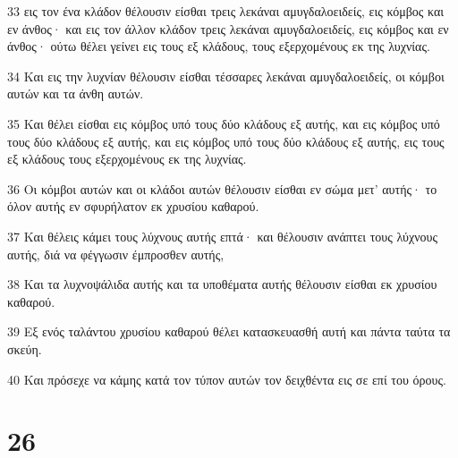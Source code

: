\par 33 εις τον ένα κλάδον θέλουσιν είσθαι τρεις λεκάναι αμυγδαλοειδείς, εις κόμβος και εν άνθος· και εις τον άλλον κλάδον τρεις λεκάναι αμυγδαλοειδείς, εις κόμβος και εν άνθος· ούτω θέλει γείνει εις τους εξ κλάδους, τους εξερχομένους εκ της λυχνίας.
\par 34 Και εις την λυχνίαν θέλουσιν είσθαι τέσσαρες λεκάναι αμυγδαλοειδείς, οι κόμβοι αυτών και τα άνθη αυτών.
\par 35 Και θέλει είσθαι εις κόμβος υπό τους δύο κλάδους εξ αυτής, και εις κόμβος υπό τους δύο κλάδους εξ αυτής, και εις κόμβος υπό τους δύο κλάδους εξ αυτής, εις τους εξ κλάδους τους εξερχομένους εκ της λυχνίας.
\par 36 Οι κόμβοι αυτών και οι κλάδοι αυτών θέλουσιν είσθαι εν σώμα μετ' αυτής· το όλον αυτής εν σφυρήλατον εκ χρυσίου καθαρού.
\par 37 Και θέλεις κάμει τους λύχνους αυτής επτά· και θέλουσιν ανάπτει τους λύχνους αυτής, διά να φέγγωσιν έμπροσθεν αυτής,
\par 38 Και τα λυχνοψάλιδα αυτής και τα υποθέματα αυτής θέλουσιν είσθαι εκ χρυσίου καθαρού.
\par 39 Εξ ενός ταλάντου χρυσίου καθαρού θέλει κατασκευασθή αυτή και πάντα ταύτα τα σκεύη.
\par 40 Και πρόσεχε να κάμης κατά τον τύπον αυτών τον δειχθέντα εις σε επί του όρους.

\chapter{26}

